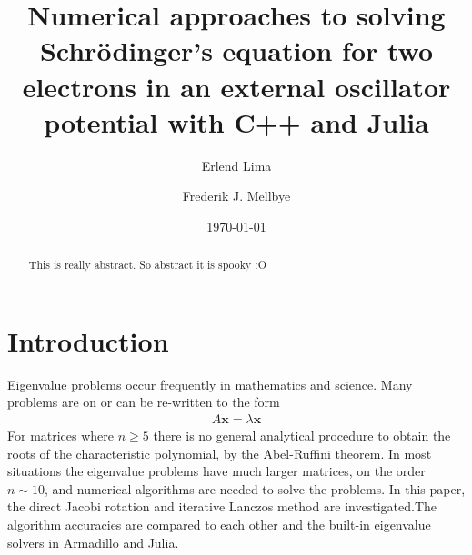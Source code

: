 \documentclass[aps,reprint]{revtex4-1}
\begin{document}
\title{Numerical approaches to solving Schrödinger's equation for
two electrons in an external oscillator potential with C++ and Julia}
\author{Erlend Lima}
\author{Frederik J. Mellbye}
\date{\today}

\begin{abstract}
  This is really abstract. So abstract it is spooky :O
\end{abstract}
\maketitle
\tableofcontents
\makeatletter
\let\toc@pre\relax
\let\toc@post\relax
\makeatother

\newpage

%
%
\section{Introduction}
\label{sec:introduction}
Eigenvalue problems occur frequently in mathematics and science. Many problems
are on or can be re-written to the form
\begin{align*}
  A \mathbf{x} = \lambda \mathbf{x}
\end{align*}
For matrices where $n \geq 5$ there is
no general analytical procedure to obtain the roots of the characteristic polynomial, by the
Abel-Ruffini theorem. In most situations the eigenvalue problems have much
larger matrices, on the order \(n\sim 10\), and numerical algorithms are needed to solve the problems. In
this paper, the direct Jacobi rotation and iterative Lanczos method
are investigated.The algorithm accuracies are compared to each other and the
built-in eigenvalue solvers in Armadillo and Julia.
\end{document}
